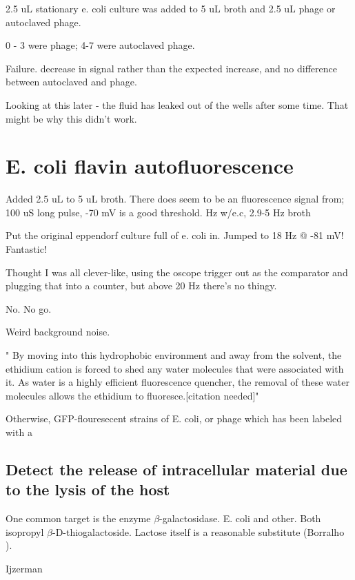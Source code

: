 \documentclass[paper.tex]{subfiles}
\begin{document}
2.5 uL stationary e. coli culture was added to 5 uL broth and 2.5 uL phage or autoclaved phage.

0 - 3 were phage; 4-7 were autoclaved phage.

Failure. decrease in signal rather than the expected increase, and no difference between autoclaved and phage.

Looking at this later - the fluid has leaked out of the wells after some time. That might be why this didn't work.



\section{E. coli flavin autofluorescence}



Added 2.5 uL to 5 uL broth. There does seem to be an fluorescence signal from; 100 uS long pulse, -70 mV is a good threshold.
Hz w/e.c, 2.9-5 Hz broth

Put the original eppendorf culture full of e. coli in. Jumped to 18 Hz @ -81 mV! Fantastic!

Thought I was all clever-like, using the oscope trigger out as the comparator and plugging that into a counter,
but above 20 Hz there's no thingy.

No. No go.

Weird background noise.

" By moving into this hydrophobic environment and away from the solvent, the ethidium cation is forced to shed any water molecules that were associated with it. As water is a highly efficient fluorescence quencher, the removal of these water molecules allows the ethidium to fluoresce.[citation needed]"




Otherwise, GFP-flouresecent strains of E. coli, or phage which has been labeled with a 




\subsection{Detect the release of intracellular material due to the lysis of the host}

One common target is the enzyme $\beta$-galactosidase. E. coli and other. Both  isopropyl $\beta$-D-thiogalactoside. Lactose itself is a reasonable substitute (Borralho \cite{Lactose2002}).

Ijzerman
\end{document}
